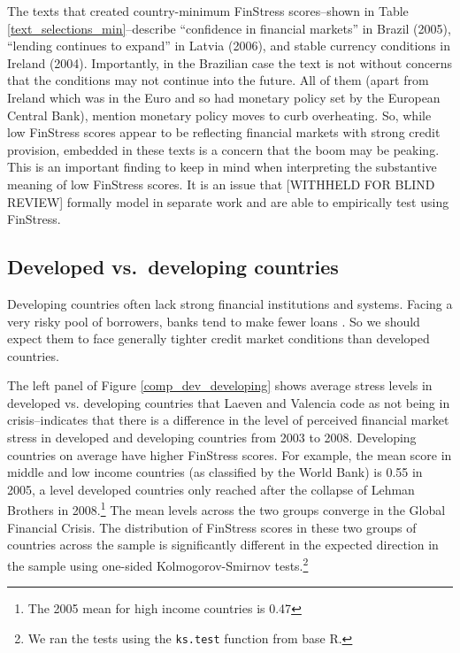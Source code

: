 \documentclass[]{article}
\begin{document}
The texts that created country-minimum FinStress scores--shown in Table \ref{text_selections_min}--describe ``confidence in financial markets'' in Brazil (2005), ``lending continues to expand'' in Latvia (2006), and stable currency conditions in Ireland (2004). Importantly, in the Brazilian case the text is not without  concerns that the conditions may not continue into the future. All of them (apart from Ireland which was in the Euro and so had monetary policy set by the European Central Bank), mention monetary policy moves to curb overheating. So, while low FinStress scores appear to be reflecting financial markets with strong credit provision, embedded in these texts is a concern that the boom may be peaking. This is an important finding to keep in mind when interpreting the substantive meaning of low FinStress scores. It is an issue that [WITHHELD FOR BLIND REVIEW] formally model in separate work and are able to empirically test using FinStress.



\subsection*{Developed vs.~developing
countries}\label{developed-vs.developing-countries}

Developing countries often lack strong financial institutions and systems. Facing a very risky pool of borrowers, banks tend to make fewer loans \citep{Andrianova2014}. So we should expect them to face generally tighter credit market conditions than developed countries.

The left panel of Figure \ref{comp_dev_developing} shows average stress levels in developed vs. developing countries that Laeven and Valencia code as not being in crisis--indicates that there is a difference in the level of perceived financial market stress in developed and developing countries from 2003 to 2008. Developing countries on average have higher FinStress scores. For example, the mean score in middle and low income countries (as classified by the World Bank) is 0.55 in 2005, a level developed countries only reached after the collapse of Lehman Brothers in 2008.\footnote{The 2005 mean for high income countries is 0.47} The mean levels across the two groups converge in the Global Financial Crisis. The distribution of FinStress scores in these two groups of countries across the sample is significantly different in the expected direction in the sample using one-sided Kolmogorov-Smirnov tests.\footnote{We ran the tests using the \texttt{ks.test} function from base R.}
\end{document}
